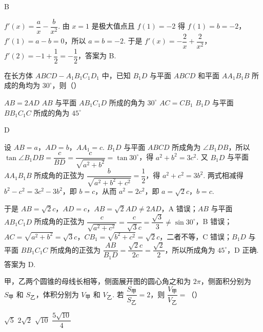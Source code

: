 \begin{answer}
B
\end{answer}

\begin{solution}
\(f'(x)=\dfrac ax-\dfrac b{x^2}\). 由 \(x=1\) 是极大值点且 \(f(1)=-2\) 得 \(f(1)=b=-2\)，\(f'(1)=a-b=0\)，所以 \(a=b=-2\). 于是 \(f'(x)=-\dfrac2x+\dfrac2{x^2}\)，\(f'(2)=-1+\dfrac12=-\dfrac12\)，答案为 B.
\end{solution}

\begin{problem}
在长方体 \(ABCD-A_1B_1C_1D_1\) 中，已知 \(B_1D\) 与平面 \(ABCD\) 和平面 \(AA_1B_1B\) 所成的角均为 \(30^\circ\)，则（\quad）


\choices
    {\(AB=2AD\)}
    {\(AB\) 与平面 \(AB_1C_1D\) 所成的角为 \(30^\circ\)}
    {\(AC=CB_1\)}
    {\(B_1D\) 与平面 \(BB_1C_1C\) 所成的角为 \(45^\circ\)}
\end{problem}

\begin{answer}
D
\end{answer}

\begin{solution}
设 \(AB=a\)，\(AD=b\)，\(AA_1=c\). \(B_1D\) 与平面 \(ABCD\) 所成角为 \(\angle B_1DB\)，所以 \(\tan\angle B_1DB=\dfrac{c}{BD}=\dfrac{c}{\sqrt{a^2+b^2}}=\tan30^\circ\)，得 \(a^2+b^2=3c^2\). 又 \(B_1D\) 与平面 \(AA_1B_1B\) 所成角的正弦为 \(\dfrac{b}{\sqrt{a^2+b^2+c^2}}=\dfrac12\)，得 \(a^2+c^2=3b^2\). 两式相减得 \(b^2-c^2=3c^2-3b^2\)，即 \(b=c\)，从而 \(a^2=2c^2\)，即 \(a=\sqrt2c\)，\(b=c\).

于是 \(AB=\sqrt2c\)，\(AD=c\)，\(AB=\sqrt2AD\ne2AD\)，A 错误；\(AB\) 与平面 \(AB_1C_1D\) 所成角的正弦为 \(\dfrac{c}{\sqrt{a^2+c^2}}=\dfrac{c}{\sqrt3c}=\dfrac{\sqrt3}3\ne\sin30^\circ\)，B 错误；\(AC=\sqrt{a^2+b^2}=\sqrt3c\)，\(CB_1=\sqrt{b^2+c^2}=\sqrt2c\)，二者不等，C 错误；\(B_1D\) 与平面 \(BB_1C_1C\) 所成角的正弦为 \(\dfrac{AB}{B_1D}=\dfrac{\sqrt2c}{2c}=\dfrac{\sqrt2}2\)，所以所成角为 \(45^\circ\)，D 正确. 答案为 D.
\end{solution}

\begin{problem}
甲，乙两个圆锥的母线长相等，侧面展开图的圆心角之和为 \(2\pi\)，侧面积分别为 \(S_{\text{甲}}\) 和 \(S_{\text{乙}}\)，体积分别为 \(V_{\text{甲}}\) 和 \(V_{\text{乙}}\). 若 \(\dfrac{S_{\text{甲}}}{S_{\text{乙}}}=2\)，则 \(\dfrac{V_{\text{甲}}}{V_{\text{乙}}}=\)（\quad）

\choices
    {\(\sqrt{5}\)}
    {\(2\sqrt{2}\)}
    {\(\sqrt{10}\)}
    {\(\dfrac{5\sqrt{10}}{4}\)}
\end{problem}

